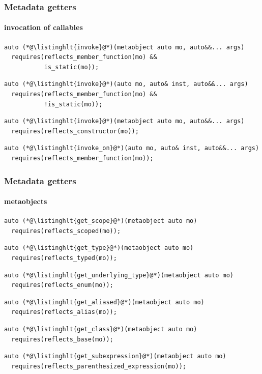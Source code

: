 \documentclass[aspectratio=169,compress,table,xcolor=table]{beamer}
\begin{document}
\begin{frame}[fragile]
  \frametitle{Metadata getters}
  \framesubtitle{invocation of callables}
  \begin{lstlisting}[language=c++2x,basicstyle=\footnotesize\ttfamily]
auto (*@\listinghlt{invoke}@*)(metaobject auto mo, auto&&... args)
  requires(reflects_member_function(mo) &&
           is_static(mo));
  \end{lstlisting}
  \vfill
  \begin{lstlisting}[language=c++2x,basicstyle=\footnotesize\ttfamily]
auto (*@\listinghlt{invoke}@*)(auto mo, auto& inst, auto&&... args)
  requires(reflects_member_function(mo) &&
           !is_static(mo));
  \end{lstlisting}
  \vfill
  \begin{lstlisting}[language=c++2x,basicstyle=\footnotesize\ttfamily]
auto (*@\listinghlt{invoke}@*)(metaobject auto mo, auto&&... args)
  requires(reflects_constructor(mo));
  \end{lstlisting}
  \vfill
  \begin{lstlisting}[language=c++2x,basicstyle=\footnotesize\ttfamily]
auto (*@\listinghlt{invoke_on}@*)(auto mo, auto& inst, auto&&... args)
  requires(reflects_member_function(mo));
  \end{lstlisting}
\end{frame}
\begin{frame}[fragile]
  \frametitle{Metadata getters}
  \framesubtitle{metaobjects}
 \begin{lstlisting}[language=c++2x,basicstyle=\small\ttfamily]
auto (*@\listinghlt{get_scope}@*)(metaobject auto mo)
  requires(reflects_scoped(mo));
  \end{lstlisting}
  \vfill
  \begin{lstlisting}[language=c++2x,basicstyle=\small\ttfamily]
auto (*@\listinghlt{get_type}@*)(metaobject auto mo)
  requires(reflects_typed(mo));
  \end{lstlisting}
  \vfill
  \begin{lstlisting}[language=c++2x,basicstyle=\small\ttfamily]
auto (*@\listinghlt{get_underlying_type}@*)(metaobject auto mo)
  requires(reflects_enum(mo));
  \end{lstlisting}
  \vfill
  \begin{lstlisting}[language=c++2x,basicstyle=\small\ttfamily]
auto (*@\listinghlt{get_aliased}@*)(metaobject auto mo)
  requires(reflects_alias(mo));
  \end{lstlisting}
  \vfill
  \begin{lstlisting}[language=c++2x,basicstyle=\small\ttfamily]
auto (*@\listinghlt{get_class}@*)(metaobject auto mo)
  requires(reflects_base(mo));
  \end{lstlisting}
  \vfill
  \begin{lstlisting}[language=c++2x,basicstyle=\footnotesize\ttfamily]
auto (*@\listinghlt{get_subexpression}@*)(metaobject auto mo)
  requires(reflects_parenthesized_expression(mo));
  \end{lstlisting}
\end{frame}
\end{document}

